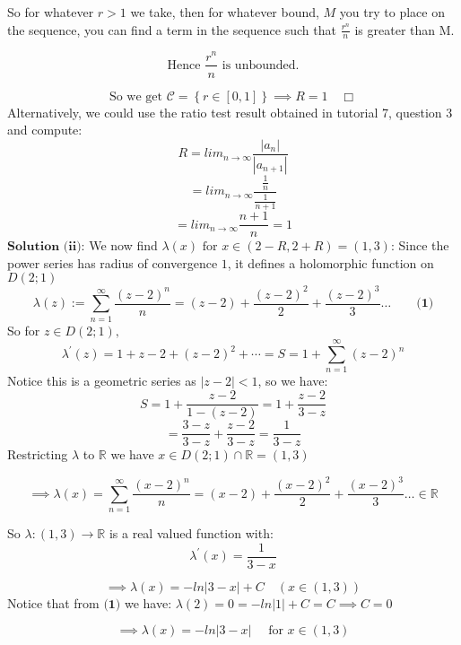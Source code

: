 \documentclass[12pt]{article}
\begin{document}
\noindent So for whatever \( r > 1 \) we take, then for whatever bound, \(M\) you try to place on the sequence, you can find a term in the sequence such that \(\frac{r^n}{n}\) is greater than M.

\[
\text{Hence }  \frac{r^n}{n} \text{ is unbounded.}
\]

\[
\text{So we get } \mathscr{C} = \left\{ r \in [0, 1] \right\} \implies R = 1 \quad \Box
\]
\hrulefill\newline
\linebreak
\noindent Alternatively, we could use the ratio test result obtained in tutorial 7, question 3 and compute:
\[
R = lim_{n \to \infty} \frac{\left| a_n \right|}{\left| a_{n+1} \right|}
\]
\[
=  lim_{n \to \infty}  \frac{\frac{1}{n}}{\frac{1}{n+1}}
\]
\[
= lim_{n \to \infty} \frac{n+1}{n} = 1
\]
\hrulefill
\newline
\linebreak
\noindent \(\textbf{Solution (ii):}\) We now find \( \lambda(x) \text{ for } x \in \left(2-R, 2+ R\right) = \left(1,3\right)\):\newline
\linebreak
\noindent Since the power series has radius of convergence \(1\), it defines a holomorphic function on \(D(2;1)\) 
\[\lambda(z) := \sum_{n=1}^{\infty} \frac{\left(z-2\right)^n}{n} = \left(z-2\right) + \frac{\left(z-2\right)^2}{2} + \frac{\left(z-2\right)^3}{3}\dots \qquad \textbf{(1)}\] 
\noindent So for \(z \in D(2;1), \)
\[\lambda^{\prime}(z) = 1 + z -2 + \left(z-2\right)^2 + \cdots =  S = 1 + \sum_{n=1}^{\infty} \left(z-2\right)^n \]
\noindent Notice this is a geometric series as \(\left| z-2 \right| < 1 \), so we have:
\[
S = 1 + \frac{z-2}{1-\left(z-2\right)} = 1+ \frac{z-2}{3-z}
\]
\[
=\frac{3-z}{3-z} + \frac{z-2}{3-z} = \frac{1}{3-z}
\]
\linebreak
\noindent Restricting \( \lambda \) to \(\mathbb{R}\) we have \(x \in D(2;1) \cap \mathbb{R} = \left( 1,3 \right) \)

\[\implies \lambda(x) = \sum_{n=1}^{\infty} \frac{\left(x-2\right)^n}{n} = \left(x-2\right) + \frac{\left(x-2\right)^2}{2} + \frac{\left(x-2\right)^3}{3}\dots \in \mathbb{R} \]

\noindent So \(\lambda : \left(1,3\right) \to \mathbb{R}\) is a real valued function with:
\[
\lambda^{\prime}(x) = \frac{1}{3-x}
\]

\[
\implies \lambda(x) = -ln\left|3-x\right| + C \quad \left(x \in \left(1,3\right)\right)
\]
\linebreak
\noindent Notice that from \(\textbf{(1)}\) we have: \(\lambda(2) = 0 = -ln\left|1\right| + C = C \implies C = 0\)

\[
\implies \lambda(x) = -ln\left|3-x\right| \quad \text{ for } x \in \left(1,3\right)
\]
\[\]
\hrulefill
\end{document}
